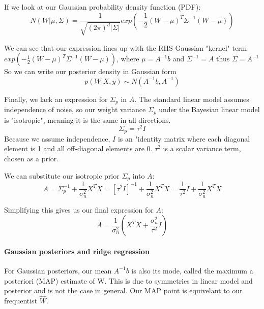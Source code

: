 \documentclass[10pt]{article}
\begin{document}
If we look at our Gaussian probability density function (PDF): 
\begin{equation} \label{eq:gaussian_pdf}
    N(W | \mu, \Sigma) = \frac{1}{\sqrt{(2\pi)^d |\Sigma|}} exp\left(-\frac{1}{2}(W - \mu)^T\Sigma^{-1}(W - \mu)\right)
\end{equation}

We can see that our expression lines up with the RHS Gaussian "kernel" term $exp\left(-\frac{1}{2}(W - \mu)^T\Sigma^{-1}(W - \mu)\right)$, where $\mu = A^{-1}b$ and $\Sigma^{-1} = A$ thus $\Sigma = A^{-1}$
So we can write our posterior density in Gaussian form
\begin{equation} \label{eq:posterior_gaussian}
    p(W|X,y) \sim N(A^{-1}b, A^{-1})
\end{equation}

Finally, we lack an expression for $\Sigma_p$ in $A$. The standard linear model assumes independence of noise, so our weight variance $\Sigma_p$ under the Bayesian linear model is "isotropic", meaning it is the same in all directions.
\begin{equation*}
    \Sigma_p = \tau^2 I
\end{equation*}
Because we assume independence, $I$ is an "identity matrix where each diagonal element is 1 and all off-diagonal elements are 0. $\tau^2$ is a scalar variance term, chosen as a prior.

We can substitute our isotropic prior $\Sigma_p$ into $A$:
\begin{equation*}
    A = \Sigma_p^{-1} + \frac{1}{\sigma^2_n}X^TX = \left[{\tau^2}I\right]^{-1} + \frac{1}{\sigma^2_n}X^TX =  \frac{1}{\tau^2}I + \frac{1}{\sigma^2_n}X^TX
\end{equation*}

Simplifying this gives us our final expression for $A$:
\begin{equation} \label{eq:A_isotropic}
A = \frac{1}{\sigma_n^2}\left(X^TX + \frac{\sigma_n^2}{\tau^2}I\right)
\end{equation}

\paragraph{Gaussian posteriors and ridge regression}
For Gaussian posteriors, our mean $A^{-1}b$ is also its mode, called the maximum a posteriori (MAP) estimate of W. This is due to symmetries in linear model and posterior and is not the case in general. Our MAP point is equivelant to our frequentist $\hat{W}$. 
\end{document}
